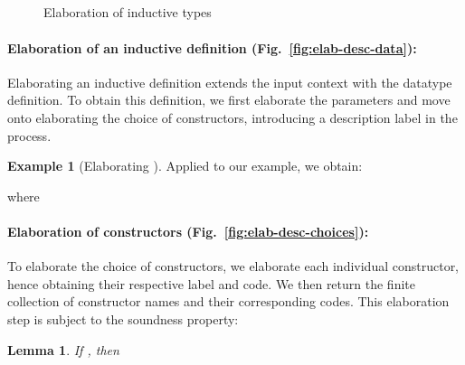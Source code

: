 \documentclass{scrartcl}
\theoremstyle{plain}
\newtheorem{lemma}{Lemma}
\theoremstyle{definition}
\newtheorem{example}{Example}
\begin{document}
\begin{figure}[htp]

\centering



\\
\\
\\
\\



\caption{Elaboration of inductive types}
\label{fig:elab-desc}

\end{figure}




\paragraph{Elaboration of an inductive definition (Fig.~\ref{fig:elab-desc-data}):}
Elaborating an inductive definition extends the input context with the
datatype definition. To obtain this definition, we first elaborate the
parameters and move onto elaborating the choice of constructors,
introducing a description label in the process.

\begin{example}[Elaborating ]

Applied to our example, we obtain:

where


\end{example}



\paragraph{Elaboration of constructors (Fig.~\ref{fig:elab-desc-choices}):} 
To elaborate the choice of constructors, we elaborate each individual
constructor, hence obtaining their respective label and code. We then
return the finite collection of constructor names and their
corresponding codes. This elaboration step is subject to the soundness
property:
\begin{lemma}\label{lemma:elab-desc-choices}
If , 
then 
\end{lemma}
\end{document}
